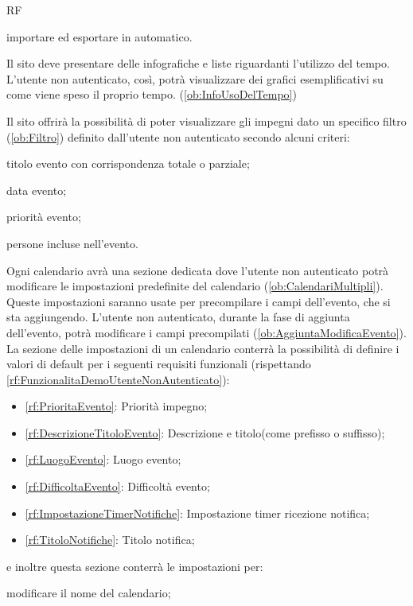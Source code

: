 \begin{listaPersonale}{RF}
\begin{listaPersonale2}[RF]{}
		 importare ed esportare in automatico.
	\end{listaPersonale2}

	 Il sito deve presentare delle infografiche e liste riguardanti l'utilizzo del tempo. L'utente non autenticato, così, potrà visualizzare dei grafici esemplificativi su come viene speso il proprio tempo. (\ref{ob:InfoUsoDelTempo})

	 Il sito offrirà la possibilità di poter visualizzare gli impegni dato un specifico filtro (\ref{ob:Filtro}) definito dall'utente non autenticato secondo alcuni criteri:
	\begin{listaPersonale2}[RF]{}
		 titolo evento con corrispondenza totale o parziale;

		 data evento;

		 priorità evento;

		 persone incluse nell'evento.
	\end{listaPersonale2}

	 Ogni calendario avrà una sezione dedicata dove l'utente non autenticato potrà modificare le impostazioni predefinite del calendario (\ref{ob:CalendariMultipli}). Queste impostazioni saranno usate per precompilare i campi dell'evento, che si sta aggiungendo. L'utente non autenticato, durante la fase di aggiunta dell'evento, potrà modificare i campi precompilati (\ref{ob:AggiuntaModificaEvento}). La sezione delle impostazioni di un calendario conterrà la possibilità di definire i valori di default per i seguenti requisiti funzionali (rispettando \ref{rf:FunzionalitaDemoUtenteNonAutenticato}):
	\begin{itemize}
		\item \ref{rf:PrioritaEvento}: Priorità impegno;
		\item \ref{rf:DescrizioneTitoloEvento}: Descrizione e titolo(come prefisso o suffisso);
		\item \ref{rf:LuogoEvento}: Luogo evento;
		\item \ref{rf:DifficoltaEvento}: Difficoltà evento;
		\item \ref{rf:ImpostazioneTimerNotifiche}: Impostazione timer ricezione notifica;
		\item \ref{rf:TitoloNotifiche}: Titolo notifica;
	\end{itemize}
	e inoltre questa sezione conterrà le impostazioni per:
	\begin{listaPersonale2}[RF]{}
		 modificare il nome del calendario;


\end{listaPersonale2}
\end{listaPersonale}
